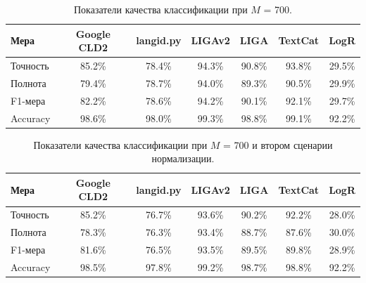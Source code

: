 \documentclass[a4paper, 14pt]{article}
\begin{document}
\begin{center}
\begin{table}
\begin{tabular*}{0.954\textwidth}{| l| *{6}{|c} |}
\hline 
Мера & Google CLD2 & langid.py & LIGAv2 & LIGA & TextCat  & LogR\\
\hline
Точность & 85.2\% & 78.4\% & 94.3\% & 90.8\% & 93.8\% & 29.5\%\\
Полнота & 79.4\% & 78.7\% & 94.0\% & 89.3\% & 90.5\% & 29.9\%\\
F1-мера & 82.2\% & 78.6\% & 94.2\% & 90.1\% & 92.1\% & 29.7\%\\
Accuracy & 98.6\% & 98.0\% & 99.3\% & 98.8\% & 99.1\% & 92.2\%\\
\hline
\end{tabular*}
\caption{Показатели качества классификации при $M$ = 700.}
\end{table}
\end{center}

\begin{center}
\begin{table}
\begin{tabular*}{0.954\textwidth}{| l| *{6}{|c} |}
\hline 
Мера & Google CLD2 & langid.py & LIGAv2 & LIGA & TextCat  & LogR\\
\hline
Точность & 85.2\% & 76.7\% & 93.6\% & 90.2\% & 92.2\% & 28.0\%\\
Полнота & 78.3\% & 76.3\% & 93.4\% & 88.7\% & 87.6\% & 30.0\%\\
F1-мера & 81.6\% & 76.5\% & 93.5\% & 89.5\% & 89.8\% & 28.9\%\\
Accuracy & 98.5\% & 97.8\% & 99.2\% & 98.7\% & 98.8\% & 92.2\%\\
\hline
\end{tabular*}
\caption{Показатели качества классификации при $M$ = 700 и втором сценарии нормализации.}
\end{table}
\end{center}
\end{document}
